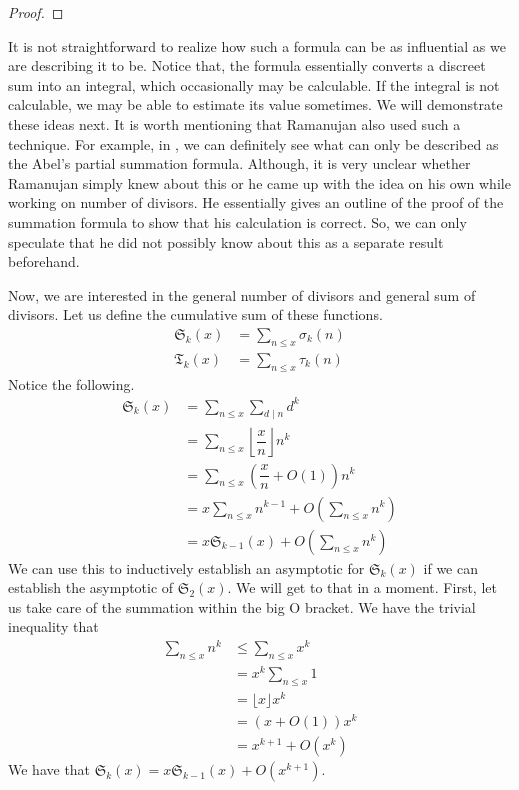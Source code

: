 \documentclass[elemannt.tex]{subfile}
\begin{document}
		\begin{proof}
			
		\end{proof}
	It is not straightforward to realize how such a formula can be as influential as we are describing it to be. Notice that, the formula essentially converts a discreet sum into an integral, which occasionally may be calculable. If the integral is not calculable, we may be able to estimate its value sometimes. We will demonstrate these ideas next. It is worth mentioning that Ramanujan also used such a technique. For example, in \textcite[Page $83$, $\S4$]{aiyangar_hardy_vennkatesvara_seshu_aiyar_p_wilson_1927}, we can definitely see what can only be described as the Abel's partial summation formula. Although, it is very unclear whether Ramanujan simply knew about this or he came up with the idea on his own while working on number of divisors. He essentially gives an outline of the proof of the summation formula to show that his calculation is correct. So, we can only speculate that he did not possibly know about this as a separate result beforehand.
	
	Now, we are interested in the general number of divisors and general sum of divisors. Let us define the cumulative sum of these functions.
		\begin{align*}
			\mathfrak{S}_{k}(x)
				& = \sum_{n\leq x}\sigma_{k}(n)\\
			\mathfrak{T}_{k}(x)
				& = \sum_{n\leq x}\tau_{k}(n)
		\end{align*}
	Notice the following.
		\begin{align*}
			\mathfrak{S}_{k}(x)
				& = \sum_{n\leq x}\sum_{d\mid n}d^{k}\\
				& = \sum_{n\leq x}\left\lfloor{\dfrac{x}{n}}\right\rfloor n^{k}\\
				& = \sum_{n\leq x}\left(\dfrac{x}{n}+O(1)\right)n^{k}\\
				& = x\sum_{n\leq x}n^{k-1}+O\left(\sum_{n\leq x}n^{k}\right)\\
				& = x\mathfrak{S}_{k-1}(x)+O\left(\sum_{n\leq x}n^{k}\right)
		\end{align*}
	We can use this to inductively establish an asymptotic for $\mathfrak{S}_{k}(x)$ if we can establish the asymptotic of $\mathfrak{S}_{2}(x)$. We will get to that in a moment. First, let us take care of the summation within the big O bracket. We have the trivial inequality that
		\begin{align*}
			\sum_{n\leq x}n^{k}
				& \leq \sum_{n\leq x}x^{k}\\
				& = x^{k}\sum_{n\leq x}1\\
				& = \lfloor{x}\rfloor x^{k}\\
				& = (x+O(1))x^{k}\\
				& = x^{k+1}+O(x^{k})
		\end{align*}
	We have that $\mathfrak{S}_{k}(x)=x\mathfrak{S}_{k-1}(x)+O(x^{k+1})$.
\end{document}
